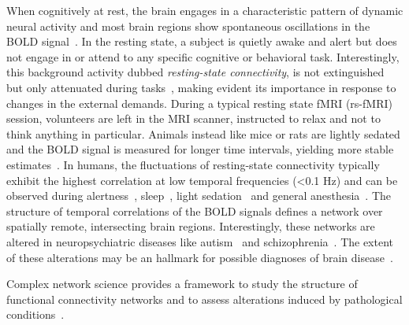 When cognitively at rest, the brain engages in a characteristic pattern of dynamic neural activity and most brain regions show spontaneous oscillations in the BOLD signal~\cite{biswal1995,raichle2001,gusnard2001}. In the resting state, a subject is quietly awake and alert but does not engage in or attend to any specific cognitive or behavioral task.
Interestingly, this background activity dubbed \emph{resting-state connectivity}, is not extinguished but only attenuated during tasks~\cite{fransson2006}, making evident its importance in response to changes in the external demands.
During a typical resting state fMRI (rs-fMRI) session, volunteers are left in the MRI scanner, instructed to relax and not to think anything in particular.
Animals instead like mice or rats are lightly sedated and the BOLD signal is measured for longer time intervals, yielding more stable estimates~\cite{jonckers2015}.
In humans, the fluctuations of resting-state connectivity typically exhibit the highest correlation at low temporal frequencies (<0.1 Hz) and can be observed during alertness~\cite{fox2006}, sleep~\cite{horovitz2009}, light sedation~\cite{greicius2008} and general anesthesia~\cite{martuzzi2010}.
The structure of temporal correlations of the BOLD signals defines a network over spatially remote, intersecting brain regions.
Interestingly, these networks are altered in neuropsychiatric diseases like autism~\cite{rudie2013} and schizophrenia~\cite{vandenheuvel2014}.
The extent of these alterations may be an hallmark for possible diagnoses of brain disease~\cite{stam2014,fornito2015}.

Complex network science provides a framework to study the structure of functional connectivity networks and to assess alterations induced by pathological conditions~\cite{bullmore2009,stam2014,crossley2014,fornito2015}.


